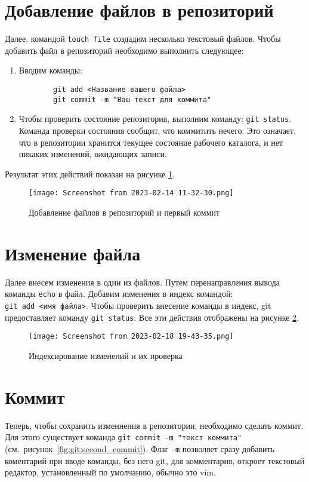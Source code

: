 \section{Добавление файлов в репозиторий}
Далее, командой \texttt{touch file} создадим несколько текстовый файлов.
Чтобы добавить файл в репозиторий необходимо выполнить следующее:
\begin{enumerate}
	\item Вводим команды:
	\begin{verbatim}
		git add <Название вашего файла>
		git commit -m "Ваш текст для коммита"
	\end{verbatim}
	\item Чтобы проверить состояние репозитория,
	выполним команду: \texttt{git~status}.
	Команда проверки состояния сообщит, что коммитить нечего.
	Это означает, что в репозитории хранится текущее состояние
	рабочего каталога, и нет никаких изменений, ожидающих записи.
\end{enumerate}
Результат этих действий показан на рисунке \ref{fig:git:first_commit}.
\begin{figure}[h!tp]
	\centering
	\texttt{[image: Screenshot from 2023-02-14 11-32-30.png]}
	\caption{Добавление файлов в репозиторий и первый коммит}
	\label{fig:git:first_commit}
\end{figure}

\section{Изменение файла}

Далее внесем изменения в один из файлов. Путем перенаправления вывода команды
\texttt{echo} в файл. Добавим изменения в индекс командой:
\texttt{git~add~<имя~файла>}. Чтобы проверить внесение команды в индекс,
git предоставляет команду \texttt{git~status}. Все эти действия отображены
на рисунке \ref{fig:git:changes}.

\begin{figure}[h!tp]
	\centering
	\texttt{[image: Screenshot from 2023-02-18 19-43-35.png]}
	\caption{Индексирование изменений и их проверка}
	\label{fig:git:changes}
\end{figure}

\section{Коммит}

Теперь, чтобы сохранить изменнения в репозитории, необходимо сделать коммит.
Для этого существует команда \texttt{git~commit~-m~"текст~коммита"}
(см.~рисунок~\ref{fig:git:second_commit}).
Флаг \texttt{-m} позволяет сразу добавить коментарий при вводе команды, без
него git, для комментария, откроет текстовый редактор,
установленный по умолчанию, обычно это vim.

